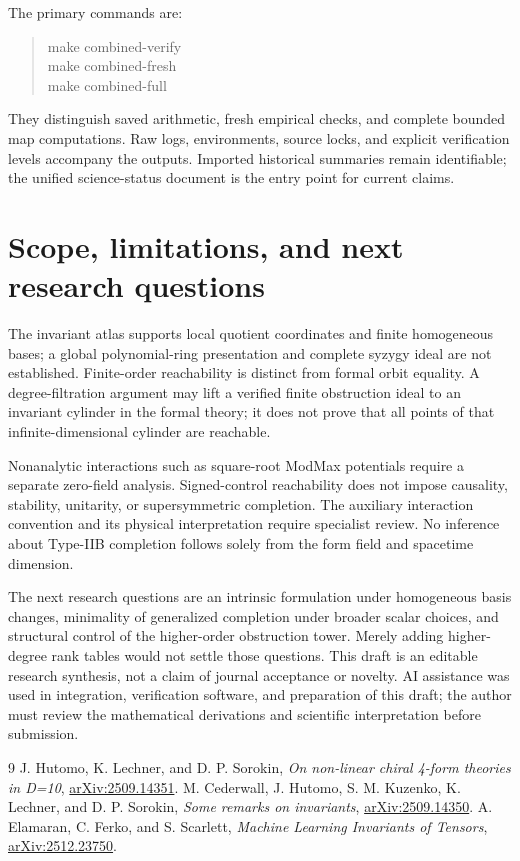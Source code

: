 \documentclass[11pt]{article}
\begin{document}
The primary commands are:
\begin{quote}\ttfamily
make combined-verify\\
make combined-fresh\\
make combined-full
\end{quote}
They distinguish saved arithmetic, fresh empirical checks, and complete bounded
map computations. Raw logs, environments, source locks, and explicit verification
levels accompany the outputs. Imported historical summaries remain identifiable;
the unified science-status document is the entry point for current claims.

\section{Scope, limitations, and next research questions}
The invariant atlas supports local quotient coordinates and finite homogeneous
bases; a global polynomial-ring presentation and complete syzygy ideal are not
established. Finite-order reachability is distinct from formal orbit equality.
A degree-filtration argument may lift a verified finite obstruction ideal to
an invariant cylinder in the formal theory; it does not prove that all points
of that infinite-dimensional cylinder are reachable.

Nonanalytic interactions such as square-root ModMax potentials require a
separate zero-field analysis. Signed-control reachability does not impose
causality, stability, unitarity, or supersymmetric completion. The auxiliary
interaction convention and its physical interpretation require specialist
review. No inference about Type-IIB completion follows solely from the form
field and spacetime dimension.

The next research questions are an intrinsic formulation under homogeneous
basis changes, minimality of generalized completion under broader scalar choices,
and structural control of the higher-order obstruction tower. Merely adding
higher-degree rank tables would not settle those questions. This draft is
an editable research synthesis, not a claim of journal acceptance or novelty.
AI assistance was used in integration, verification software, and preparation
of this draft; the author must review the mathematical derivations and scientific
interpretation before submission.

\begin{thebibliography}{9}
 J. Hutomo, K. Lechner, and D. P. Sorokin,
\emph{On non-linear chiral 4-form theories in D=10},
\href{https://arxiv.org/abs/2509.14351}{arXiv:2509.14351}.
 M. Cederwall, J. Hutomo, S. M. Kuzenko, K. Lechner, and D. P. Sorokin,
\emph{Some remarks on invariants},
\href{https://arxiv.org/abs/2509.14350}{arXiv:2509.14350}.
 A. Elamaran, C. Ferko, and S. Scarlett,
\emph{Machine Learning Invariants of Tensors},
\href{https://arxiv.org/abs/2512.23750}{arXiv:2512.23750}.
\end{thebibliography}
\end{document}
